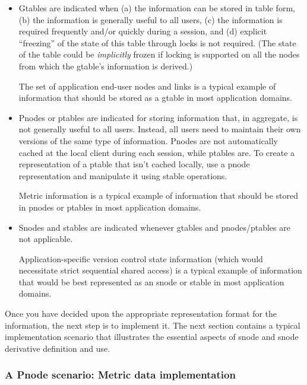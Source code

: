 \begin{itemize}
\item Gtables are indicated when (a) the information can be stored in
  table form, (b) the information is generally useful to all users, (c) the
  information is required frequently and/or quickly during a session, and
  (d) explicit ``freezing'' of the state of this table through locks is not
  required. (The state of the table could be {\em implicitly} frozen if
  locking is supported on all the nodes from which the gtable's information
  is derived.)
  
  The set of application end-user nodes and links is a typical example of
  information that should be stored as a gtable in most application
  domains.
  
  
\item Pnodes or ptables are indicated for storing information that, in
  aggregate, is not generally useful to all users. Instead, all users need
  to maintain their own versions of the same type of information.  Pnodes
  are not automatically cached at the local client during each session,
  while ptables are.  To create a representation of a ptable that isn't
  cached locally, use a pnode representation and manipulate it using stable
  operations.

  Metric information is a typical example of information that should be
  stored in pnodes or ptables in most application domains. 
  
  
\item Snodes and stables are indicated whenever gtables and
  pnodes/ptables are not applicable.
  
  Application-specific version control state information (which would
  necessitate strict sequential shared access) is a typical example of
  information that would be best represented as an snode or stable in
  most application domains.

\end{itemize}

Once you have decided upon the appropriate representation format for the
information, the next step is to implement it.  The next section
contains a typical implementation scenario that illustrates the essential
aspects of snode and snode derivative definition and use.  

\subsubsection*{A Pnode scenario: Metric data implementation}

